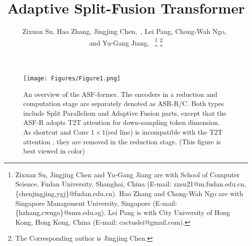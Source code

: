 \documentclass[lettersize,journal]{IEEEtran}
\begin{document}
\title{Adaptive Split-Fusion Transformer}

\author{Zixuan Su, Hao Zhang, Jingjing Chen,~, Lei Pang, Chong-Wah Ngo,~\\ and Yu-Gang Jiang,~
\thanks{Zixuan Su, Jingjing Chen and Yu-Gang Jiang are with School of Computer Science, Fudan University, Shanghai, China (E-mail: zxsu21@m.fudan.edu.cn, \{chenjingjing,ygj\}@fudan.edu.cn). Hao Zhang and Chong-Wah Ngo are with Singapore Management University, Singapore (E-mail: \{hzhang,cwngo\}@smu.edu.sg). Lei Pang is with City University of Hong Kong, Hong Kong, China (E-mail: cactuslei@gmail.com).}
\thanks{The Corresponding author is Jingjing Chen.}
}





\maketitle

\begin{figure*}
\centering
\texttt{[image: Figures/Figure1.png]}
\caption{An overview of the ASF-former. The encoders in a reduction and computation stage are separately denoted as ASR-R/C. Both types include Split Parallelism and Adaptive Fusion parts, except that the ASF-R adopts T2T attention for down-sampling token dimension. As shortcut and Conv $1\times1$({\color{red}red} line) is incompatible with the T2T attention \cite{yuan2021tokens}, they are removed in the reduction stage. (This figure is best viewed in color)
}
\label{fig:framework}
\end{figure*}
\end{document}
